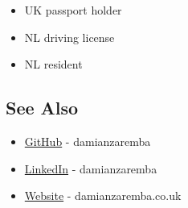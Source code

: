 \begin{itemize}
\tightlist
\item
  UK passport holder
\item
  NL driving license
\item
  NL resident
\end{itemize}

\hypertarget{see-also}{%
\subsection{See Also}\label{see-also}}

\begin{itemize}
\tightlist
\item
  \href{https://github.com/damianzaremba}{GitHub} - damianzaremba
\item
  \href{http://uk.linkedin.com/in/damianzaremba}{LinkedIn} -
  damianzaremba
\item
  \href{http://damianzaremba.co.uk}{Website} - damianzaremba.co.uk
\end{itemize}
